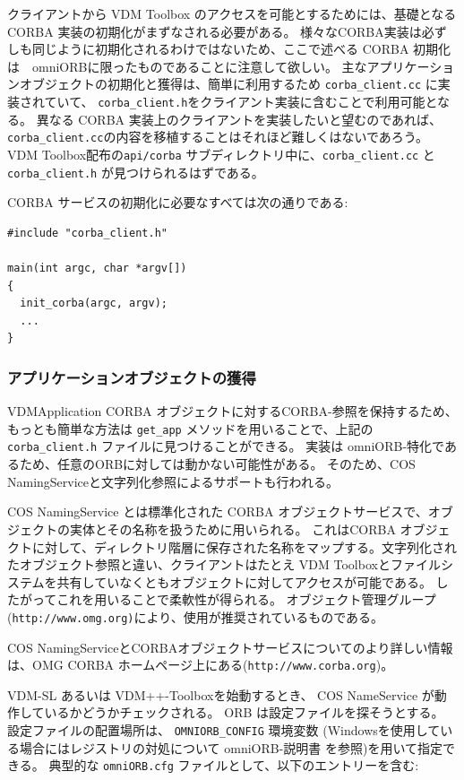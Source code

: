 \documentclass[\pformat,12pt]{jarticle}
\begin{document}
クライアントから VDM Toolbox のアクセスを可能とするためには、基礎となるCORBA 実装の初期化がまずなされる必要がある。
様々なCORBA実装は必ずしも同じように初期化されるわけではないため、ここで述べる CORBA 初期化は　omniORBに限ったものであることに注意して欲しい。
主なアプリケーションオブジェクトの初期化と獲得は、簡単に利用するため {\tt  corba\_client.cc} に実装されていて、 {\tt corba\_client.h}をクライアント実装に含むことで利用可能となる。
異なる CORBA 実装上のクライアントを実装したいと望むのであれば、 {\tt corba\_client.cc}の内容を移植することはそれほど難しくはないであろう。 
VDM Toolbox配布の\texttt{api/corba} サブディレクトリ中に、\texttt{corba\_client.cc} と \texttt{corba\_client.h} が見つけられるはずである。

CORBA サービスの初期化に必要なすべては次の通りである:

\begin{verbatim}
#include "corba_client.h"

main(int argc, char *argv[])
{
  init_corba(argc, argv);
  ...
}
\end{verbatim}

\subsubsection{アプリケーションオブジェクトの獲得}

VDMApplication CORBA オブジェクトに対するCORBA-参照を保持するため、もっとも簡単な方法は {\tt get\_app} メソッドを用いることで、上記の \texttt{corba\_client.h} ファイルに見つけることができる。
実装は omniORB-特化であるため、任意のORBに対しては動かない可能性がある。
そのため、COS NamingServiceと文字列化参照によるサポートも行われる。

COS NamingService とは標準化された CORBA オブジェクトサービスで、オブジェクトの実体とその名称を扱うために用いられる。
これはCORBA オブジェクトに対して、ディレクトリ階層に保存された名称をマップする。文字列化されたオブジェクト参照と違い、クライアントはたとえ VDM Toolboxとファイルシステムを共有していなくともオブジェクトに対してアクセスが可能である。
したがってこれを用いることで柔軟性が得られる。
オブジェクト管理グループ (\texttt{http://www.omg.org)}により、使用が推奨されているものである。

COS NamingServiceとCORBAオブジェクトサービスについてのより詳しい情報は、OMG CORBA ホームページ上にある(\texttt{http://www.corba.org})。

VDM-SL あるいは VDM++-Toolboxを始動するとき、 COS NameService が動作しているかどうかチェックされる。
ORB は設定ファイルを探そうとする。
設定ファイルの配置場所は、 {\tt OMNIORB\_CONFIG} 環境変数 (Windowsを使用している場合にはレジストリの対処について omniORB-説明書 を参照)を用いて指定できる。
典型的な {\tt omniORB.cfg} ファイルとして、以下のエントリーを含む:
\end{document}
